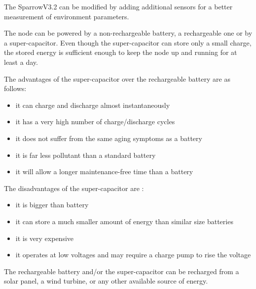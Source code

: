 The SparrowV3.2 can be modified by adding additional sensors for a better measurement of environment parameters.

The node can be powered by a non-rechargeable battery, a rechargeable one or by a super-capacitor. Even though the super-capacitor can store only a small charge, the stored energy is sufficient enough to keep the node up and running for at least a day.

The advantages of the super-capacitor over the rechargeable battery are as follows:

\begin{itemize}
\item it can charge and discharge almost instantaneously 
\item it has a very high number of charge/discharge cycles 
\item it does not suffer from the same aging symptoms as a battery
\item it is far less pollutant than a standard battery
\item it will allow a longer maintenance-free time than a battery

\end{itemize}

The disadvantages of the super-capacitor are :

\begin{itemize}
\item it is bigger than battery
\item it can store a much smaller amount of energy than similar size batteries
\item it is very expensive
\item it operates at low voltages and may require a charge pump to rise the voltage

\end{itemize}

The rechargeable battery and/or the super-capacitor can be recharged from a solar panel, a wind turbine, or any other available source of energy.
